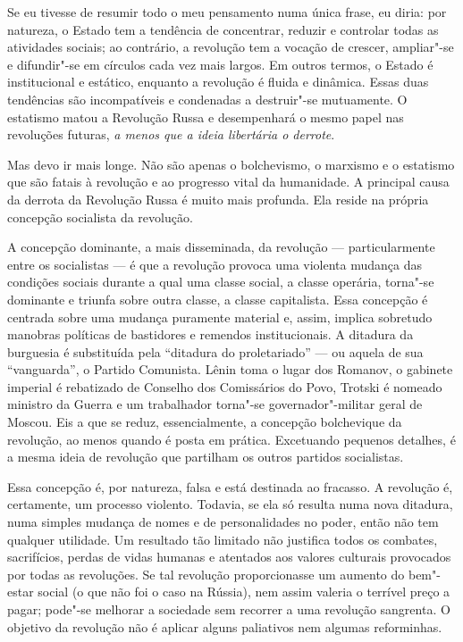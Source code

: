 Se eu tivesse de resumir todo o meu pensamento numa única frase, eu diria:
por natureza, o Estado tem a tendência de concentrar, reduzir e controlar
todas as atividades sociais; ao contrário, a revolução tem a vocação de
crescer, ampliar"-se e difundir"-se em círculos cada vez mais largos.
Em outros termos, o Estado é institucional e estático, enquanto a
revolução é fluida e dinâmica. Essas duas tendências são incompatíveis e
condenadas a destruir"-se mutuamente. O estatismo matou a Revolução
Russa e desempenhará o mesmo papel nas revoluções futuras, \textit{a menos
que a ideia libertária o derrote}. 

Mas devo ir mais longe. Não são apenas o bolchevismo, o marxismo e o
estatismo que são fatais à revolução e ao progresso vital da
humanidade. A principal causa da derrota da Revolução Russa é muito
mais profunda. Ela reside na própria concepção socialista da revolução.

A concepção dominante, a mais disseminada, da revolução ---
particularmente entre os socialistas --- é que a revolução provoca uma
violenta mudança das condições sociais durante a qual uma classe
social, a classe operária, torna"-se dominante e triunfa sobre outra
classe, a classe capitalista. Essa concepção é centrada sobre uma
mudança puramente material e, assim, implica sobretudo manobras
políticas de bastidores e remendos institucionais. A ditadura da
burguesia é substituída pela “ditadura do proletariado” --- ou aquela de
sua “vanguarda”, o Partido Comunista. Lênin toma o lugar dos Romanov, o
gabinete imperial é rebatizado de Conselho dos Comissários do Povo,
Trotski é nomeado ministro da Guerra e um trabalhador torna"-se
governador"-militar geral de Moscou. Eis a que se reduz,
essencialmente, a concepção bolchevique da revolução, ao menos quando é
posta em prática. Excetuando pequenos detalhes, é a mesma ideia de
revolução que partilham os outros partidos socialistas.

Essa concepção é, por natureza, falsa e está destinada ao fracasso. A
revolução é, certamente, um processo violento. Todavia, se ela só
resulta numa nova ditadura, numa simples mudança de nomes e de
personalidades no poder, então não tem qualquer utilidade. Um resultado
tão limitado não justifica todos os combates, sacrifícios, perdas
de vidas humanas e atentados aos valores culturais provocados por
todas as revoluções. Se tal revolução proporcionasse um aumento do
bem"-estar social (o que não foi o caso na Rússia), nem assim valeria
o terrível preço a pagar; pode"-se melhorar a sociedade sem recorrer a
uma revolução sangrenta. O objetivo da revolução não é aplicar alguns
paliativos nem algumas reforminhas.

